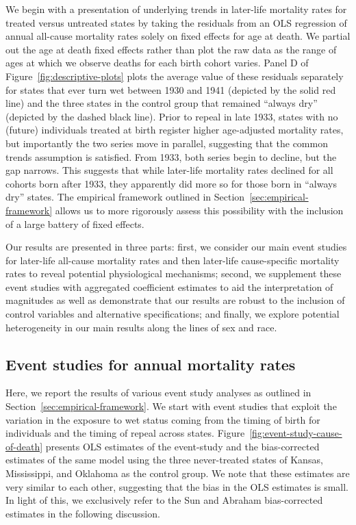 \documentclass[12pt]{article}
\begin{document}
We begin with a presentation of underlying trends in later-life mortality rates for treated versus untreated states by taking the residuals from an OLS regression of annual all-cause mortality rates solely on fixed effects for age at death. 
We partial out the age at death fixed effects rather than plot the raw data as the range of ages at which we observe deaths for each birth cohort varies. 
Panel D of Figure~\ref{fig:descriptive-plots} plots the average value of these residuals separately for states that ever turn wet between 1930 and 1941 (depicted by the solid red line) and the three states in the control group that remained ``always dry'' (depicted by the dashed black line). 
Prior to repeal in late 1933, states with no (future) individuals treated at birth register higher age-adjusted mortality rates, but importantly the two series move in parallel, suggesting that the common trends assumption is satisfied. 
From 1933, both series begin to decline, but the gap narrows. 
This suggests that while later-life mortality rates declined for all cohorts born after 1933, they apparently did more so for those born in ``always dry'' states. 
The empirical framework outlined in Section~\ref{sec:empirical-framework} allows us to more rigorously assess this possibility with the inclusion of a large battery of fixed effects. 

Our results are presented in three parts: first, we consider our main event studies for later-life all-cause mortality rates and then later-life cause-specific mortality rates to reveal potential physiological mechanisms; second, we supplement these event studies with aggregated coefficient estimates to aid the interpretation of magnitudes as well as demonstrate that our results are robust to the inclusion of control variables and alternative specifications; and finally, we explore potential heterogeneity in our main results along the lines of sex and race. 

\subsection{Event studies for annual mortality rates}\label{sec:results-event-studies}

Here, we report the results of various event study analyses as outlined in Section~\ref{sec:empirical-framework}. 
We start with event studies that exploit the variation in the exposure to wet status coming from the timing of birth for individuals and the timing of repeal across states. 
Figure~\ref{fig:event-study-cause-of-death} presents OLS estimates of the event-study and the  bias-corrected estimates of the same model using the three never-treated states of Kansas, Mississippi, and Oklahoma as the control group. 
We note that these estimates are very similar to each other, suggesting that the bias in the OLS estimates is small. 
In light of this, we exclusively refer to the Sun and Abraham bias-corrected estimates in the following discussion. 
\end{document}
